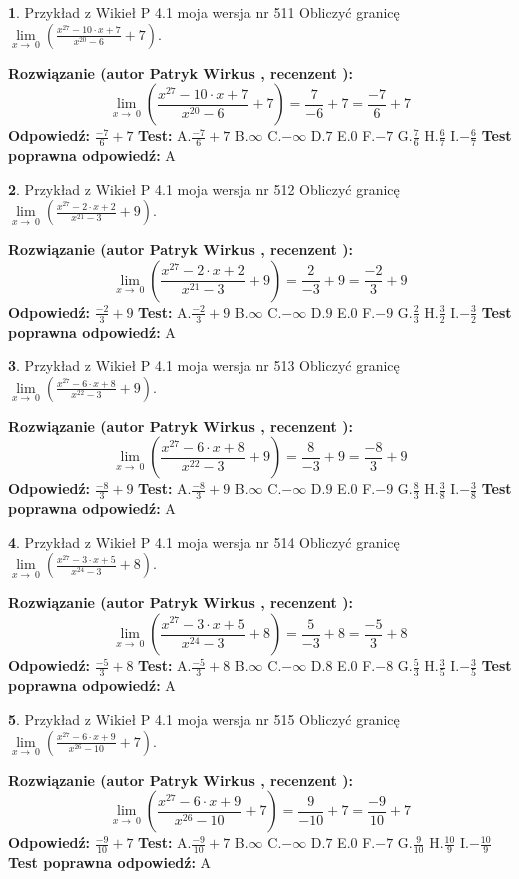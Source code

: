 \documentclass[12pt, a4paper]{article}
\theoremstyle{definition} %
\newtheorem{zad}{}
\newcommand{\zadStart}[1]{\begin{zad}#1\newline}
\newcommand{\zadStop}{\end{zad}}
\newcommand{\rozwStart}[2]{\noindent \textbf{Rozwiązanie (autor #1 , recenzent #2): }\newline}
\newcommand{\rozwStop}{\newline}
\newcommand{\odpStart}{\noindent \textbf{Odpowiedź:}\newline}
\newcommand{\odpStop}{\newline}
\newcommand{\testStart}{\noindent \textbf{Test:}\newline}
\newcommand{\testStop}{\newline}
\newcommand{\kluczStart}{\noindent \textbf{Test poprawna odpowiedź:}\newline}
\newcommand{\kluczStop}{\newline}
\begin{document}
\zadStart{Przykład z Wikieł P 4.1 moja wersja nr 511}
Obliczyć granicę $\lim\limits_{x\to\ 0}(\frac{x^{27}-10 \cdot x +7}{x^{20}-6}+7)$.
\zadStop
\rozwStart{Patryk Wirkus}{}
$$\lim\limits_{x\to\ 0}(\frac{x^{27}-10 \cdot x +7}{x^{20}-6}+7)=\frac{7}{-6}+7=\frac{-7}{6}+7$$
\rozwStop
\odpStart
$\frac{-7}{6}+7$
\odpStop
\testStart
A.$\frac{-7}{6}+7$
B.$\infty$
C.$-\infty$
D.$7$
E.$0$
F.$-7$
G.$\frac{7}{6}$
H.$\frac{6}{7}$
I.$-\frac{6}{7}$
\testStop
\kluczStart
A
\kluczStop



\zadStart{Przykład z Wikieł P 4.1 moja wersja nr 512}
Obliczyć granicę $\lim\limits_{x\to\ 0}(\frac{x^{27}-2 \cdot x +2}{x^{21}-3}+9)$.
\zadStop
\rozwStart{Patryk Wirkus}{}
$$\lim\limits_{x\to\ 0}(\frac{x^{27}-2 \cdot x +2}{x^{21}-3}+9)=\frac{2}{-3}+9=\frac{-2}{3}+9$$
\rozwStop
\odpStart
$\frac{-2}{3}+9$
\odpStop
\testStart
A.$\frac{-2}{3}+9$
B.$\infty$
C.$-\infty$
D.$9$
E.$0$
F.$-9$
G.$\frac{2}{3}$
H.$\frac{3}{2}$
I.$-\frac{3}{2}$
\testStop
\kluczStart
A
\kluczStop



\zadStart{Przykład z Wikieł P 4.1 moja wersja nr 513}
Obliczyć granicę $\lim\limits_{x\to\ 0}(\frac{x^{27}-6 \cdot x +8}{x^{22}-3}+9)$.
\zadStop
\rozwStart{Patryk Wirkus}{}
$$\lim\limits_{x\to\ 0}(\frac{x^{27}-6 \cdot x +8}{x^{22}-3}+9)=\frac{8}{-3}+9=\frac{-8}{3}+9$$
\rozwStop
\odpStart
$\frac{-8}{3}+9$
\odpStop
\testStart
A.$\frac{-8}{3}+9$
B.$\infty$
C.$-\infty$
D.$9$
E.$0$
F.$-9$
G.$\frac{8}{3}$
H.$\frac{3}{8}$
I.$-\frac{3}{8}$
\testStop
\kluczStart
A
\kluczStop



\zadStart{Przykład z Wikieł P 4.1 moja wersja nr 514}
Obliczyć granicę $\lim\limits_{x\to\ 0}(\frac{x^{27}-3 \cdot x +5}{x^{24}-3}+8)$.
\zadStop
\rozwStart{Patryk Wirkus}{}
$$\lim\limits_{x\to\ 0}(\frac{x^{27}-3 \cdot x +5}{x^{24}-3}+8)=\frac{5}{-3}+8=\frac{-5}{3}+8$$
\rozwStop
\odpStart
$\frac{-5}{3}+8$
\odpStop
\testStart
A.$\frac{-5}{3}+8$
B.$\infty$
C.$-\infty$
D.$8$
E.$0$
F.$-8$
G.$\frac{5}{3}$
H.$\frac{3}{5}$
I.$-\frac{3}{5}$
\testStop
\kluczStart
A
\kluczStop



\zadStart{Przykład z Wikieł P 4.1 moja wersja nr 515}
Obliczyć granicę $\lim\limits_{x\to\ 0}(\frac{x^{27}-6 \cdot x +9}{x^{26}-10}+7)$.
\zadStop
\rozwStart{Patryk Wirkus}{}
$$\lim\limits_{x\to\ 0}(\frac{x^{27}-6 \cdot x +9}{x^{26}-10}+7)=\frac{9}{-10}+7=\frac{-9}{10}+7$$
\rozwStop
\odpStart
$\frac{-9}{10}+7$
\odpStop
\testStart
A.$\frac{-9}{10}+7$
B.$\infty$
C.$-\infty$
D.$7$
E.$0$
F.$-7$
G.$\frac{9}{10}$
H.$\frac{10}{9}$
I.$-\frac{10}{9}$
\testStop
\kluczStart
A
\kluczStop
\end{document}
